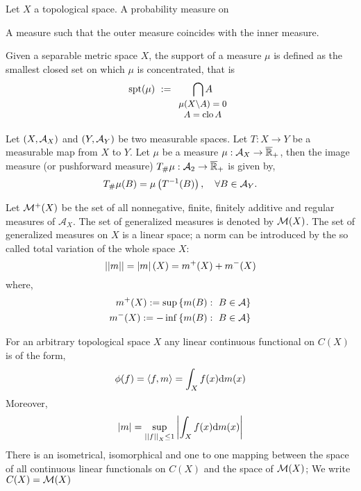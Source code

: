 Let $X$ a topological space. 
A probability measure on \cite{Milan2000TpicsWeakconvProbs}
\begin{theorem}
	A measure such that the outer measure coincides with the inner measure.
\end{theorem}
\begin{definition}
	Given a separable metric space $X$, the support of a measure $\mu$ is defined as the smallest closed set on which $\mu$ is concentrated, that is
	\begin{equation}
	\spt(\mu)\ :=\underset{\small{\begin{array}{c}
			\mu(X\backslash A)=0\\ A=\closu A  \end{array}}}{\bigcap A} 		
	\end{equation} 
\end{definition}
\begin{definition}
	Let $\left( X, \mathcal{A}_X \right)$  and $\left( Y, \mathcal{A}_Y \right)$ be two measurable spaces. Let $T:X\rightarrow Y$ be a measurable map from $X$ to $Y$. Let $\mu$ be a measure $\mu: \mathcal{A}_X\rightarrow \overline{\mathbb{R}}_+$, then the image measure (or pushforward measure) ${T}_{\#} \mu:\mathcal{A}_2\rightarrow \overline{\mathbb{R}}_+$ is given by,
	\begin{equation*}
	{T}_{\#} \mu(B) = \mu\left( T^{-1}(B) \right), \quad \forall B \in \mathcal{A}_Y.
	\end{equation*}
\end{definition}
Let $\mathcal{M}^+(X)$ be the set of all nonnegative, finite, finitely additive and regular measures of $\mathcal{A}_X$. The set of generalized measures is denoted by $\mathcal{M}(X)$. The set of generalized measures on $X$ is a linear space; a norm can be introduced by the so called total variation of the whole space $X$:
\begin{equation}
	\left|\left|m\right|\right|=\left| m \right|(X)=m^+(X)+m^-(X)
\end{equation}
where, 
\begin{align*}
	m^+(X):=\sup\left\lbrace m(B):\ B \in \mathcal{A} \right\rbrace \\
	m^-(X):=-\inf\left\lbrace m(B):\ B \in \mathcal{A} \right\rbrace
\end{align*}
\begin{theorem}[Aleksandrov]
	For an arbitrary topological space $X$ any linear continuous functional on $C(X)$ is of the form,
	\begin{equation}
		\phi(f)=\left\langle f,m \right\rangle=\int_{X}f(x)\mathrm{d} m(x)
	\end{equation}
	Moreover,
	\begin{equation}
		\left| m \right|=\sup_{\left|\left|f\right|\right|_X\leq 1}\left| \int_{X}f(x)\mathrm{d} m(x) \right|
	\end{equation}
	There is an isometrical, isomorphical and one to one mapping between the space of all continuous linear functionals on $C(X)$ and the space of $\mathcal{M}(X)$; We write $C(X)=\mathcal{M}(X)$
\end{theorem}

